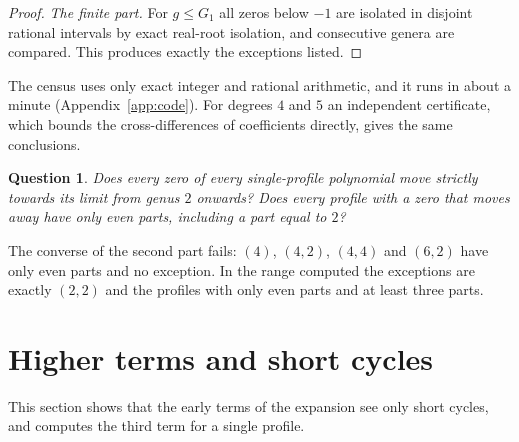 \documentclass[11pt,a4paper]{article}
\newtheorem{conjecture}[theorem]{Question}
\theoremstyle{definition}\newtheorem{definition}[theorem]{Definition}
\theoremstyle{remark}\newtheorem{remark}[theorem]{Remark}\newtheorem{example}[theorem]{Example}
\numberwithin{equation}{section}
\begin{document}
\begin{proof}
\emph{The finite part.} For $g\le G_1$ all zeros below $-1$ are isolated in disjoint rational intervals by exact real-root isolation, and consecutive genera are compared. This produces exactly the exceptions listed.
\end{proof}

The census uses only exact integer and rational arithmetic, and it runs in about a minute (Appendix~\ref{app:code}). For degrees $4$ and $5$ an independent certificate, which bounds the cross-differences of coefficients directly, gives the same conclusions.

\begin{conjecture}\label{q:genus2}
Does every zero of every single-profile polynomial move strictly towards its limit from genus $2$ onwards? Does every profile with a zero that moves away have only even parts, including a part equal to $2$?
\end{conjecture}

The converse of the second part fails: $(4)$, $(4,2)$, $(4,4)$ and $(6,2)$ have only even parts and no exception. In the range computed the exceptions are exactly $(2,2)$ and the profiles with only even parts and at least three parts.

\section{Higher terms and short cycles}\label{sec:higher}
This section shows that the early terms of the expansion see only short cycles, and computes the third term for a single profile.
\end{document}
